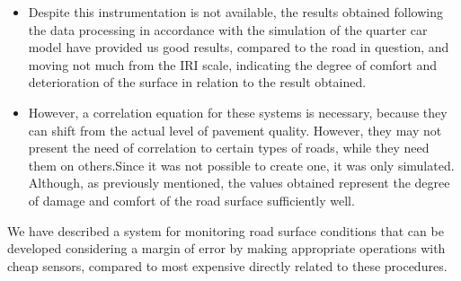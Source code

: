 \documentclass[tesi]{subfiles}
\begin{document}
\begin{description}
\begin{itemize}
\item Despite this instrumentation is not available, the results obtained following the data processing in accordance with the simulation of the quarter car model have provided us good results, compared to the road in question, and moving not much from the  IRI scale, indicating the degree of comfort and deterioration of the surface in relation to the result obtained.
\item However, a correlation equation for these systems is necessary, because they can shift from the actual level of pavement quality. However, they may not present the need of correlation to certain types of roads, while they need them on others.Since it was not possible to create one, it was only simulated. Although, as previously mentioned, the values obtained represent the degree of damage and comfort of the road surface sufficiently well.
\end{itemize}
\end{description}

We have described a system for monitoring road surface conditions that can be developed considering a margin of error by making appropriate operations with cheap sensors, compared to most expensive directly related to these procedures. 
\clearpage
\end{document}
